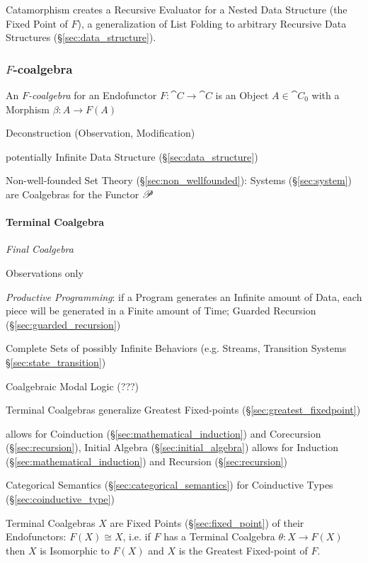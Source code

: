 Catamorphism creates a Recursive Evaluator for a Nested Data Structure
(the Fixed Point of $F$), a generalization of List Folding to
arbitrary Recursive Data Structures (\S\ref{sec:data_structure}).



\subsubsection{$F$-coalgebra}\label{sec:f_coalgebra}

An \emph{$F$-coalgebra} for an Endofunctor $F : \cat{C} \rightarrow
\cat{C}$ is an Object $A \in \cat{C}_0$ with a Morphism $\beta : A
\rightarrow F(A)$ \cite{corfield08}

Deconstruction (Observation, Modification)

potentially Infinite Data Structure (\S\ref{sec:data_structure})

Non-well-founded Set Theory (\S\ref{sec:non_wellfounded}): Systems
(\S\ref{sec:system}) are Coalgebras for the Functor $\mathscr{P}$



\paragraph{Terminal Coalgebra}\label{sec:terminal_coalgebra}\hfill

\emph{Final Coalgebra}

Observations only

\emph{Productive Programming}: if a Program generates an Infinite
amount of Data, each piece will be generated in a Finite amount of
Time; Guarded Recursion (\S\ref{sec:guarded_recursion})
\cite{atkey-mcbride13}

Complete Sets of possibly Infinite Behaviors (e.g. Streams, Transition
Systems \S\ref{sec:state_transition})

Coalgebraic Modal Logic (???)

Terminal Coalgebras generalize Greatest Fixed-points
(\S\ref{sec:greatest_fixedpoint}) \cite{rutten00}

allows for Coinduction (\S\ref{sec:mathematical_induction}) and
Corecursion (\S\ref{sec:recursion}), Initial Algebra
(\S\ref{sec:initial_algebra}) allows for Induction
(\S\ref{sec:mathematical_induction}) and Recursion
(\S\ref{sec:recursion})

Categorical Semantics (\S\ref{sec:categorical_semantics}) for
Coinductive Types (\S\ref{sec:coinductive_type})

Terminal Coalgebras $X$ are Fixed Points (\S\ref{sec:fixed_point}) of
their Endofunctors: $F(X) \cong X$, i.e. if $F$ has a Terminal
Coalgebra $\theta : X \rightarrow F(X)$ then $X$ is Isomorphic to
$F(X)$ and $X$ is the Greatest Fixed-point of $F$.

